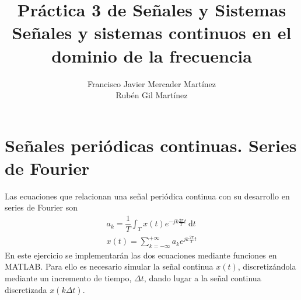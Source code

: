 \documentclass{article}
\title{\textbf{\huge Práctica 3 de Señales y Sistemas}\\ Señales y sistemas continuos en el dominio de la frecuencia}
\author{Francisco Javier Mercader Martínez\\ Rubén Gil Martínez}
\date{}
\newcommand{\dt}{\:\mathrm{d}t}
\begin{document}
\maketitle

\section{Señales periódicas continuas. Series de Fourier}
Las ecuaciones que relacionan una señal periódica continua con su desarrollo en series de Fourier son \[ \begin{array}{l}
a_k=\dfrac{1}{T}\int_Tx(t)e^{-jk\frac{2\pi}{T}t}\dt\\
x(t)=\sum_{k=-\infty}^{+\infty}a_ke^{jk\frac{2\pi}{T}t}
\end{array} \]
En este ejercicio se implementarán las dos ecuaciones mediante funciones en MATLAB. Para ello es necesario simular la señal continua $x(t)$, discretizándola mediante un incremento de tiempo, $\Delta t$, dando lugar a la señal continua discretizada $x(k\Delta t)$.
\end{document}
